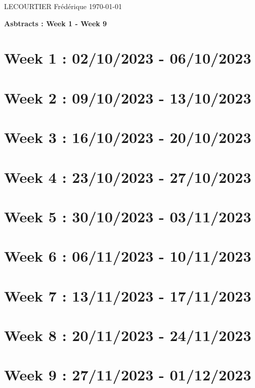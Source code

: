 \documentclass[french]{article}
\begin{document}
	LECOURTIER Frédérique \hfill \today
	\begin{center}
		\Large\textbf{{Asbtracts : Week 1 - Week 9}}
	\end{center}

	\section{Week 1 : 02/10/2023 - 06/10/2023}
	

	\section{Week 2 : 09/10/2023 - 13/10/2023}
	

	\section{Week 3 : 16/10/2023 - 20/10/2023}
	

	\section{Week 4 : 23/10/2023 - 27/10/2023}
	

	\section{Week 5 : 30/10/2023 - 03/11/2023}
	

	\section{Week 6 : 06/11/2023 - 10/11/2023}
	

	\section{Week 7 : 13/11/2023 - 17/11/2023}
	

	\section{Week 8 : 20/11/2023 - 24/11/2023}
	

	\section{Week 9 : 27/11/2023 - 01/12/2023}
	
\end{document}
